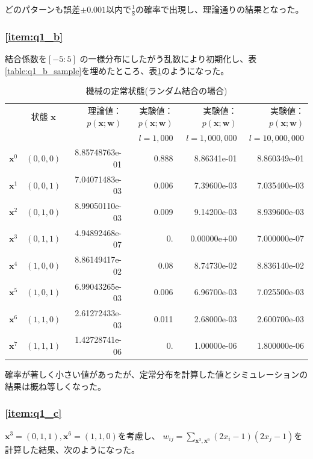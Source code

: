 \documentclass[a4j, uplatex, fleqn, dvipdfmx]{jsarticle} %
\begin{document}
どのパターンも誤差$\pm 0.001$以内で$\frac{1}{8}$の確率で出現し、理論通りの結果となった。


\subsubsection{\ref{item:q1_b}}
結合係数を$[-5:5]$ の一様分布にしたがう乱数により初期化し、表\ref{table:q1_b_sample}を埋めたところ、表\ref{table:q1_b}のようになった。

\begin{table}[htb]
  \caption{機械の定常状態(ランダム結合の場合)}
  \label{table:q1_b}
  \centering
  \begin{tabular}{|c|c|r|r|r|r|}
    \hline
     & 状態 $\bm{x}$ & 理論値： $p(\bm{x} ; \bm{w})$ & 実験値： $p(\bm{x} ; \bm{w})$ & 実験値： $p(\bm{x} ; \bm{w})$ & 実験値： $p(\bm{x} ; \bm{w})$ \\
     & & & $l=1,000$ & $l=1,000,000$ & $l=10,000,000$ \\
    \hline
    $\bm{x}^{0}$ & $(0,0,0)$ & 8.85748763e-01 & 0.888 & 8.86341e-01 & 8.860349e-01 \\
    $\bm{x}^{1}$ & $(0,0,1)$ & 7.04071483e-03 & 0.006 & 7.39600e-03 & 7.035400e-03 \\
    $\bm{x}^{2}$ & $(0,1,0)$ & 8.99050110e-03 & 0.009 & 9.14200e-03 & 8.939600e-03 \\
    $\bm{x}^{3}$ & $(0,1,1)$ & 4.94892468e-07 & 0.    & 0.00000e+00 & 7.000000e-07 \\
    $\bm{x}^{4}$ & $(1,0,0)$ & 8.86149417e-02 & 0.08  & 8.74730e-02 & 8.836140e-02 \\
    $\bm{x}^{5}$ & $(1,0,1)$ & 6.99043265e-03 & 0.006 & 6.96700e-03 & 7.025500e-03 \\
    $\bm{x}^{6}$ & $(1,1,0)$ & 2.61272433e-03 & 0.011 & 2.68000e-03 & 2.600700e-03 \\
    $\bm{x}^{7}$ & $(1,1,1)$ & 1.42728741e-06 & 0.    & 1.00000e-06 & 1.800000e-06 \\
    \hline
  \end{tabular}
\end{table}

確率が著しく小さい値があったが、定常分布を計算した値とシミュレーションの結果は概ね等しくなった。

\subsubsection{\ref{item:q1_c}}
$\bm{x}^{3}=(0, 1, 1), \bm{x}^{6} = (1, 1, 0)$を考慮し、
$w_{i j}=\sum_{\bm{x}^{3}, \bm{x}^{6}}\left(2 x_{i}-1\right)\left(2 x_{j}-1\right)$を計算した結果、次のようになった。
\end{document}
